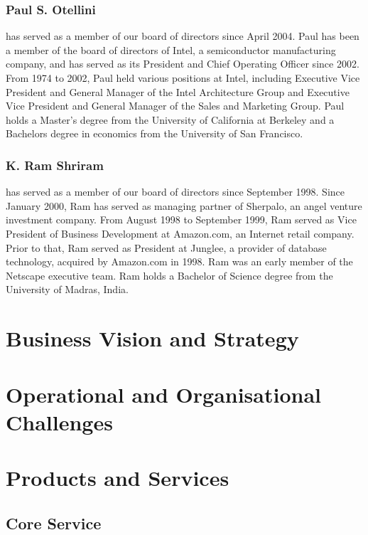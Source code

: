\documentclass[a4paper,12pt]{article}
\begin{document}
\subsubsection{Paul S. Otellini}

has served as a member of our board of directors since
April 2004. Paul has been a member of the board of directors of Intel, a
semiconductor manufacturing company, and has served as its President and
Chief Operating Officer since 2002. From 1974 to 2002, Paul held various
positions at Intel, including Executive Vice President and General
Manager of the Intel Architecture Group and Executive Vice President and
General Manager of the Sales and Marketing Group. Paul holds a Master's
degree from the University of California at Berkeley and a Bachelors
degree in economics from the University of San Francisco.

\subsubsection{K. Ram Shriram}

has served as a member of our board of directors since
September 1998. Since January 2000, Ram has served as managing partner
of Sherpalo, an angel venture investment company. From August 1998 to
September 1999, Ram served as Vice President of Business Development at
Amazon.com, an Internet retail company. Prior to that, Ram served as
President at Junglee, a provider of database technology, acquired by
Amazon.com in 1998. Ram was an early member of the Netscape executive
team. Ram holds a Bachelor of Science degree from the University of
Madras, India.

\section{Business Vision and Strategy}

\section{Operational and Organisational Challenges}

\section{Products and Services}

\subsection{Core Service}
\end{document}
